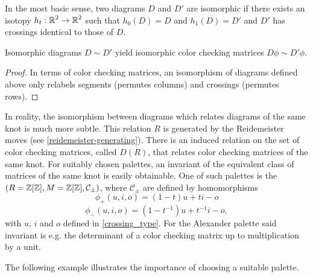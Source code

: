 In the most basic sense, two diagrams $D$ and $D'$ are isomorphic if there exists an isotopy $h_t:\operatorname{\mathbb{R}}^2\to \operatorname{\mathbb{R}}^2$ such that $h_0(D)=D$ and $h_1(D)=D'$ and $D'$ has crossings identical to those of $D$.

\begin{lemma}
  Isomorphic diagrams $D\sim D'$ yield isomorphic color checking matrices $D\phi\sim D'\phi$.
\end{lemma}

\begin{proof}
  In terms of color checking matrices, an isomorphism of diagrams defined above only relabels segments (permutes columns) and crossings (permutes rows).
\end{proof}

In reality, the isomorphism between diagrams which relates diagrams of the same knot is much more subtle. This relation $R$ is generated by the Reidemeister moves (see \cref{reidemeister-generating}). There is an induced relation on the set of color checking matrices, called $D(R)$, that relates color checking matrices of the same knot. For suitably chosen palettes, an invariant of the equivalent class of matrices of the same knot is easily obtainable. One of such palettes is the  {\boldmath$(R=\operatorname{\mathbb{Z}}[\operatorname{\mathbb{Z}}], M=\operatorname{\mathbb{Z}}[\operatorname{\mathbb{Z}}], \mathcal{C}_\pm)$}, where $\mathcal{C}_\pm$ are defined by homomorphisms
$$\phi_+(u,i,o)=(1-t)u+ti-o$$
$$\phi_-(u,i,o)=(1-t^{-1})u+t^{-1}i-o,$$
with $u$, $i$ and $o$ defined in \cref{crossing_type}. For the Alexander palette said invariant is e.g. the determinant of a color checking matrix up to multiplication by a unit. 

The following example illustrates the importance of choosing a suitable palette.

